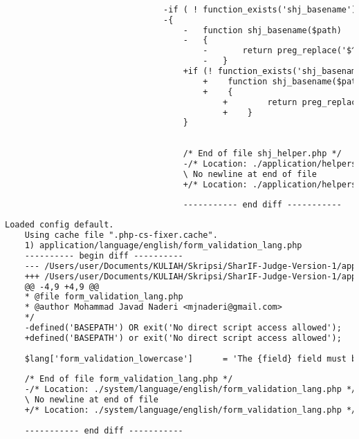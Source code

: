 \begin{lstlisting}[language=diff, caption=Perubahan pada kode shj\_helper.php]
								
								
								-if ( ! function_exists('shj_basename'))
								-{
									-	function shj_basename($path)
									-	{
										-		return preg_replace('$^.*[\\\\/]$', '', $path);
										-	}
									+if (! function_exists('shj_basename')) {
										+    function shj_basename($path)
										+    {
											+        return preg_replace('$^.*[\\\\/]$', '', $path);
											+    }
									}
									
									
									/* End of file shj_helper.php */
									-/* Location: ./application/helpers/shj_helper.php */
									\ No newline at end of file
									+/* Location: ./application/helpers/shj_helper.php */
									
									----------- end diff -----------
\end{lstlisting}


\begin{lstlisting}[language=diff, caption=Perubahan pada kode form\_validation\_lang.php]
	Loaded config default.
	Using cache file ".php-cs-fixer.cache".
	1) application/language/english/form_validation_lang.php
	---------- begin diff ----------
	--- /Users/user/Documents/KULIAH/Skripsi/SharIF-Judge-Version-1/application/language/english/form_validation_lang.php
	+++ /Users/user/Documents/KULIAH/Skripsi/SharIF-Judge-Version-1/application/language/english/form_validation_lang.php
	@@ -4,9 +4,9 @@
	* @file form_validation_lang.php
	* @author Mohammad Javad Naderi <mjnaderi@gmail.com>
	*/
	-defined('BASEPATH') OR exit('No direct script access allowed');
	+defined('BASEPATH') or exit('No direct script access allowed');
	
	$lang['form_validation_lowercase']		= 'The {field} field must be lowercase.';
	
	/* End of file form_validation_lang.php */
	-/* Location: ./system/language/english/form_validation_lang.php */
	\ No newline at end of file
	+/* Location: ./system/language/english/form_validation_lang.php */
	
	----------- end diff -----------
\end{lstlisting}


